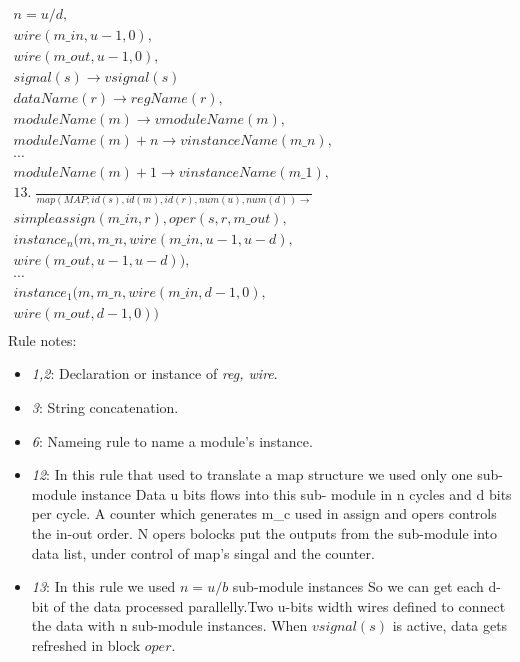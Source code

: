 \[ \begin{aligned}
  \mathit{n=u{/}d,}\\
  \mathit{wire(m\_in,u{-}1,0),}\\
  \mathit{wire(m\_out,u{-}1,0),}\\
  \mathit{signal(s) \rightarrow vsignal(s)} \\
  \mathit{dataName(r) \rightarrow regName(r),}\\
  \mathit{moduleName(m) \rightarrow vmoduleName(m),}\\
  \mathit{moduleName(m){+}n \rightarrow vinstanceName(m\_n),}\\
  \mathit{\cdots}\\
  \mathit{moduleName(m){+}1 \rightarrow vinstanceName(m\_1),}\\
  \mathit{13.\;\frac{}{map(MAP; id(s),id(m),id(r),num(u),num(d)) \rightarrow}}\\
  \mathit{simpleassign(m\_in,r),oper(s,r,m\_out),}\\
  \mathit{instance_n(m,m\_n,wire(m\_in,u{-}1,u{-}d),}\\
  \mathit{wire(m\_out,u{-}1,u{-}d)),}\\
  \mathit{\cdots}\\
  \mathit{instance_1(m,m\_n,wire(m\_in,d{-}1,0),}\\
  \mathit{wire(m\_out,d{-}1,0))}\\
\end{aligned}
\phantom{\hspace{100cm}}
\]
\normalfont
Rule notes:
\begin{itemize}\itemsep2pt \parskip0pt 
  \item[$\star$]\textit{1,2}: Declaration or instance of \textit{reg, wire}.
  \item[$\star$]\textit{3}: String concatenation.
  \item[$\star$]\textit{6}: Nameing rule to name a module's instance.
  \item[$\star$]\textit{12}: In this rule that used to translate a map structure we used only
                 one sub-module instance Data u bits flows into this sub-
                 module in  n cycles and d bits per cycle. A counter which generates m\_c
                 used in assign and opers controls the in-out order. N opers
                 bolocks put the outputs from the sub-module into data list, under control
                 of map's singal and the counter.
  \item[$\star$]\textit{13}: In this rule we used $n=u/b$
                 sub-module instances So we can get each d-bit of the data processed
                 parallelly.Two u-bits width wires defined to connect the data with n
                 sub-module instances. When $vsignal(s)$ is active, data gets refreshed
                 in block $oper$.
\end{itemize}
